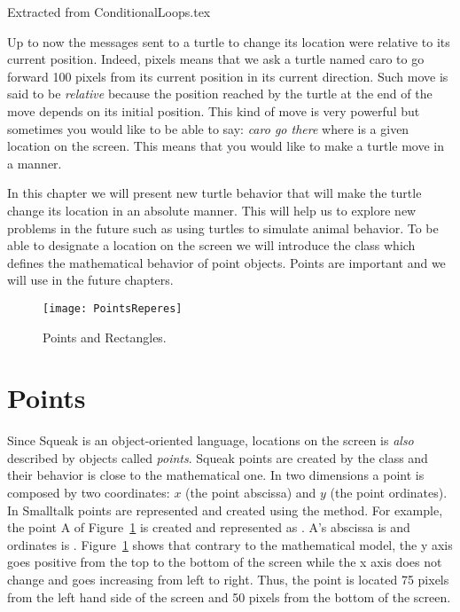Extracted from ConditionalLoops.tex%

Up to now the messages sent  to a turtle to change its location were relative to
its current position. Indeed, 
 pixels means that we ask a turtle named caro to go forward 100 pixels 
from its current position in its current direction. Such move is said to be
 \emph{relative} because the
position reached by the turtle at the end of the move depends on its
initial position. This kind of move is very powerful but sometimes you would like
to be able to say: \emph{caro go there} where  is a
given location on the screen. This means that you would like to
make a turtle move in a  manner.


In this chapter we will present new turtle behavior that will make the turtle change its location in an absolute manner.
 This will help us to explore new problems in the future such as using turtles to simulate animal behavior. To be able to designate a location on the screen we will introduce the class  which defines the mathematical behavior of point objects.  Points are  important and we will use in the future chapters. 


\begin{figure}
\begin{center}
\texttt{[image: PointsReperes]}
\caption{Points and Rectangles. \label{fig:PointsRepere}}
\end{center}
\end{figure}

\section{Points}
Since Squeak is an object-oriented language, locations on the screen is {\em also} described 
by objects called \emph{points}. Squeak points are created by the class  and their behavior is close to the mathematical one.  In two dimensions a point is composed by two coordinates: $x$ (the point abscissa) and $y$ (the point ordinates). 
In Smalltalk points are represented and created using the  method. For example, the point A of Figure~\ref{fig:PointsRepere} is created and represented as . A's abscissa is  and ordinates is . 
Figure~\ref{fig:PointsRepere} shows that contrary to the mathematical model, the y axis goes positive from the top to the bottom of the screen while the x axis does not change and goes increasing  from left to right. Thus, the point  is located 75 pixels from the left hand side of the screen and 50 pixels from the bottom of the screen.


